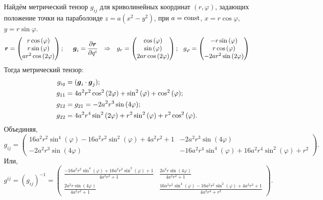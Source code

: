 Найдём метрический тензор $g_{ij}$ для криволинейных координат 
$(r, \varphi)$, задающих положение точки на параболоиде $z = a(x^2 - y^2)$, при $a=\text{const}$, $x = r \cos \varphi$, $y = r \sin \varphi$.
$$
    \mbox{\boldmath $r$} = \begin{pmatrix}r \cos{\left(\varphi \right)}\\r \sin{\left(\varphi \right)}\\a r^{2} \cos{\left(2 \varphi \right)}\end{pmatrix};
    \hspace{0.5cm} 
    \mbox{\boldmath $g$}_i = \frac{\partial \mbox{\boldmath $r$}}{\partial q^i} 
    \hspace{0.25cm} \Rightarrow \hspace{0.25cm} 
    g_r =\begin{pmatrix}\cos{\left(\varphi \right)}\\\sin{\left(\varphi \right)}\\2 a r \cos{\left(2 \varphi \right)}\end{pmatrix};
    \hspace{0.25cm} 
    g_{\varphi} = \begin{pmatrix}- r \sin{\left(\varphi \right)}\\r \cos{\left(\varphi \right)}\\- 2 a r^{2} \sin{\left(2 \varphi \right)}\end{pmatrix}
$$
Тогда метрический тензор:
\begin{align*}
        g_{ig} &= (\mbox{\boldmath $g$}_i \cdot \mbox{\boldmath $g$}_j); \\ 
        g_{11} &= 4 a^{2} r^{2} \cos^{2}{\left(2 \varphi \right)} + \sin^{2}{\left(\varphi \right)} + \cos^{2}{\left(\varphi \right)}; \\
        g_{12} &= g_{21} = - 2 a^{2} r^{3} \sin{\left(4 \varphi \right)}; \\
        g_{22} &= 4 a^{2} r^{4} \sin^{2}{\left(2 \varphi \right)} + r^{2} \sin^{2}{\left(\varphi \right)} + r^{2} \cos^{2}{\left(\varphi \right)}.
\end{align*}
Объединяя, 
$$
    g_{ij} = \begin{pmatrix}16 a^{2} r^{2} \sin^{4}{\left(\varphi \right)} - 16 a^{2} r^{2} \sin^{2}{\left(\varphi \right)} + 4 a^{2} r^{2} + 1 & - 2 a^{2} r^{3} \sin{\left(4 \varphi \right)}\\- 2 a^{2} r^{3} \sin{\left(4 \varphi \right)} & - 16 a^{2} r^{4} \sin^{4}{\left(\varphi \right)} + 16 a^{2} r^{4} \sin^{2}{\left(\varphi \right)} + r^{2}\end{pmatrix}.
$$
Или,
$$
    g^{ij} = (g_{ij})^{-1} = \begin{pmatrix}\frac{- 16 a^{2} r^{2} \sin^{4}{\left(\varphi \right)} + 16 a^{2} r^{2} \sin^{2}{\left(\varphi \right)} + 1}{4 a^{2} r^{2} + 1} & \frac{2 a^{2} r \sin{\left(4 \varphi \right)}}{4 a^{2} r^{2} + 1}\\\frac{2 a^{2} r \sin{\left(4 \varphi \right)}}{4 a^{2} r^{2} + 1} & \frac{16 a^{2} r^{2} \sin^{4}{\left(\varphi \right)} - 16 a^{2} r^{2} \sin^{2}{\left(\varphi \right)} + 4 a^{2} r^{2} + 1}{4 a^{2} r^{4} + r^{2}}\end{pmatrix}.
$$
